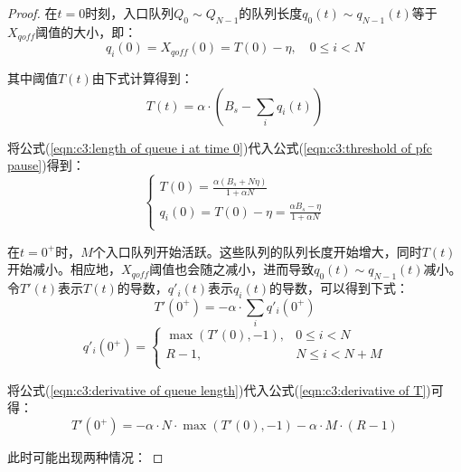 \begin{proof}
  在$t=0$时刻，入口队列$Q_0 \sim Q_{N-1}$的队列长度$q_0(t) \sim q_{N-1}(t)$等于$X_{qoff}$阈值的大小，即：
  \begin{equation}
    q_i(0)=X_{qoff}(0)=T(0)-\eta, \quad 0 \leqslant i < N
    \label{eqn:c3:length of queue i at time 0}
  \end{equation}

  其中阈值$T(t)$由下式计算得到：
  \begin{equation}
    T(t)=\alpha \cdot (B_s - \sum_{i}q_i(t))
    \label{eqn:c3:threshold of pfc pause}
  \end{equation} 
  
  将公式(\ref{eqn:c3:length of queue i at time 0})代入公式(\ref{eqn:c3:threshold of pfc pause})得到：
  \begin{equation}
    \begin{cases}
      T(0)=\frac{\alpha(B_s+N \eta)}{1+\alpha N} \\
      q_i(0)=T(0)-\eta=\frac{\alpha B_s-\eta}{1+\alpha N} \\
    \end{cases}
    \label{eqn:c3:substitute result}
  \end{equation}

  在$t=0^+$时，$M$个入口队列开始活跃。这些队列的队列长度开始增大，同时$T(t)$开始减小。相应地，$X_{qoff}$阈值也会随之减小，进而导致$q_0(t) \sim q_{N-1}(t)$减小。令$T'(t)$表示$T(t)$的导数，$q'_i(t)$表示$q_i(t)$的导数，可以得到下式：
  \begin{equation}
    T'(0^+)=-\alpha \cdot \sum_{i}q'_i(0^+)
    \label{eqn:c3:derivative of T}
  \end{equation}
  \begin{equation}
    q'_i(0^+)=
      \begin{cases}
        \max (T'(0),-1), & 0 \leqslant i < N \\
        R-1, & N \leqslant i < N+M \\
      \end{cases}
    \label{eqn:c3:derivative of queue length}
  \end{equation}  

  将公式(\ref{eqn:c3:derivative of queue length})代入公式(\ref{eqn:c3:derivative of T})可得：
  \begin{equation}
    T'(0^+)=-\alpha \cdot N \cdot \max(T'(0),-1)-\alpha \cdot M
    \cdot (R-1)
  \end{equation}

  此时可能出现两种情况：


\end{proof}
